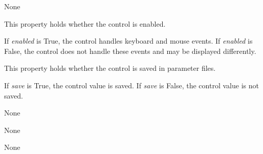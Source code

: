 \documentclass[letterpaper,10pt,english]{sphinxmanual}
\begin{document}
\begin{fulllineitems}
\begin{fulllineitems}
\end{fulllineitems}


\begin{fulllineitems}
\label{api:qwt.Chart.data}
None

\end{fulllineitems}


\begin{fulllineitems}
\label{api:qwt.Chart.enabled}
This property holds whether the control is enabled.

If \emph{enabled} is True, the control handles keyboard and mouse events.
If \emph{enabled} is False, the control does not handle these events and may
be displayed differently.

\end{fulllineitems}


\begin{fulllineitems}
\label{api:qwt.Chart.save}
This property holds whether the control is saved in parameter files.

If \emph{save} is True, the control value is saved.
If \emph{save} is False, the control value is not saved.

\end{fulllineitems}


\begin{fulllineitems}
\label{api:qwt.Chart.scroll_to_end}
None

\end{fulllineitems}


\begin{fulllineitems}
\label{api:qwt.Chart.set_curve_properties}
None

\end{fulllineitems}


\begin{fulllineitems}
\label{api:qwt.Chart.set_plot_properties}
None


\end{fulllineitems}
\end{fulllineitems}
\end{document}
